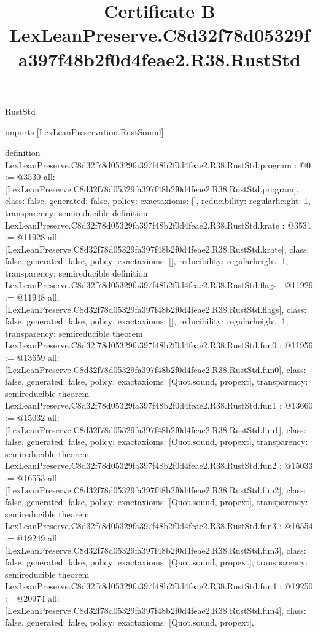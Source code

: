 \begin{lexlean}{RustStd}
\title{Certificate B LexLeanPreserve.C8d32f78d05329fa397f48b2f0d4feae2.R38.RustStd}
\begin{coremodule}
imports [LexLeanPreservation.RustSound]

definition LexLeanPreserve.C8d32f78d05329fa397f48b2f0d4feae2.R38.RustStd.program : @0 := @3530 {
  all: [LexLeanPreserve.C8d32f78d05329fa397f48b2f0d4feae2.R38.RustStd.program],
  class: false,
  generated: false,
  policy: exact{axioms: []},
  reducibility: regular{height: 1},
  transparency: semireducible
}
definition LexLeanPreserve.C8d32f78d05329fa397f48b2f0d4feae2.R38.RustStd.krate : @3531 := @11928 {
  all: [LexLeanPreserve.C8d32f78d05329fa397f48b2f0d4feae2.R38.RustStd.krate],
  class: false,
  generated: false,
  policy: exact{axioms: []},
  reducibility: regular{height: 1},
  transparency: semireducible
}
definition LexLeanPreserve.C8d32f78d05329fa397f48b2f0d4feae2.R38.RustStd.flags : @11929 := @11948 {
  all: [LexLeanPreserve.C8d32f78d05329fa397f48b2f0d4feae2.R38.RustStd.flags],
  class: false,
  generated: false,
  policy: exact{axioms: []},
  reducibility: regular{height: 1},
  transparency: semireducible
}
theorem LexLeanPreserve.C8d32f78d05329fa397f48b2f0d4feae2.R38.RustStd.fun0 : @11956 := @13659 {
  all: [LexLeanPreserve.C8d32f78d05329fa397f48b2f0d4feae2.R38.RustStd.fun0],
  class: false,
  generated: false,
  policy: exact{axioms: [Quot.sound, propext]},
  transparency: semireducible
}
theorem LexLeanPreserve.C8d32f78d05329fa397f48b2f0d4feae2.R38.RustStd.fun1 : @13660 := @15032 {
  all: [LexLeanPreserve.C8d32f78d05329fa397f48b2f0d4feae2.R38.RustStd.fun1],
  class: false,
  generated: false,
  policy: exact{axioms: [Quot.sound, propext]},
  transparency: semireducible
}
theorem LexLeanPreserve.C8d32f78d05329fa397f48b2f0d4feae2.R38.RustStd.fun2 : @15033 := @16553 {
  all: [LexLeanPreserve.C8d32f78d05329fa397f48b2f0d4feae2.R38.RustStd.fun2],
  class: false,
  generated: false,
  policy: exact{axioms: [Quot.sound, propext]},
  transparency: semireducible
}
theorem LexLeanPreserve.C8d32f78d05329fa397f48b2f0d4feae2.R38.RustStd.fun3 : @16554 := @19249 {
  all: [LexLeanPreserve.C8d32f78d05329fa397f48b2f0d4feae2.R38.RustStd.fun3],
  class: false,
  generated: false,
  policy: exact{axioms: [Quot.sound, propext]},
  transparency: semireducible
}
theorem LexLeanPreserve.C8d32f78d05329fa397f48b2f0d4feae2.R38.RustStd.fun4 : @19250 := @20974 {
  all: [LexLeanPreserve.C8d32f78d05329fa397f48b2f0d4feae2.R38.RustStd.fun4],
  class: false,
  generated: false,
  policy: exact{axioms: [Quot.sound, propext]},
}
\end{coremodule}
\end{lexlean}
